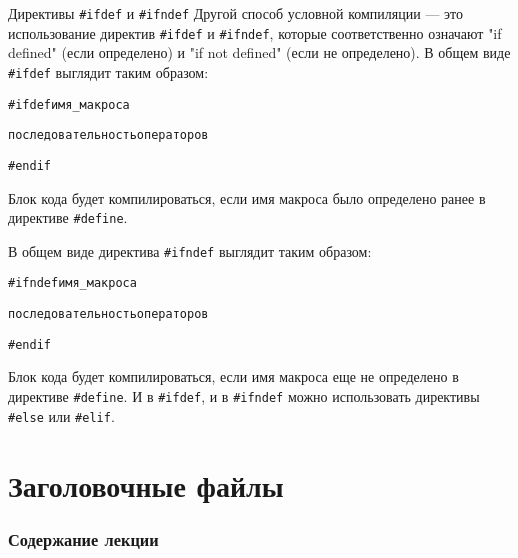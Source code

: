 \documentclass{beamer}
\begin{document}
\begin{frame}{Директивы \texttt{\#ifdef} и \texttt{\#ifndef}}
    Другой способ условной компиляции — это использование директив \texttt{\#ifdef} и \texttt{\#ifndef}, которые соответственно означают "if defined" (если определено) и "if not defined" (если не определено). В общем виде \texttt{\#ifdef} выглядит таким образом:
    
    \begin{alltt}
        \#ifdef имя\_макроса
        
        \qquad последовательность операторов
        
        \#endif
    \end{alltt}
    
    Блок кода будет компилироваться, если имя макроса было определено ранее в директиве \texttt{\#define}.
    
    \medskip
    В общем виде директива \texttt{\#ifndef} выглядит таким образом:
    
    \begin{alltt}
        \#ifndef имя\_макроса
        
        \qquad последовательность операторов
        
        \#endif
    \end{alltt}
    
    Блок кода будет компилироваться, если имя макроса еще не определено в директиве \texttt{\#define}. И в \texttt{\#ifdef}, и в \texttt{\#ifndef} можно использовать директивы \texttt{\#else} или \texttt{\#elif}.
\end{frame}

\section{Заголовочные файлы}

\begin{frame}
  \frametitle{Содержание лекции}
  \tableofcontents[current]
\end{frame}
\end{document}
